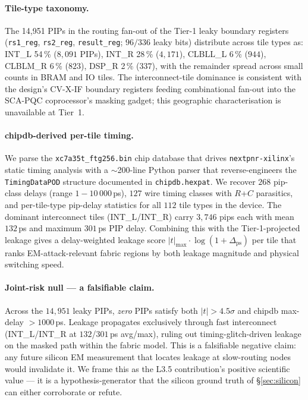 \paragraph{Tile-type taxonomy.}
The 14{,}951 PIPs in the routing fan-out of the Tier-1 leaky boundary
registers (\texttt{rs1\_reg}, \texttt{rs2\_reg}, \texttt{result\_reg};
$96/336$ leaky bits) distribute across tile types as: INT\_L 54\,\%
($8{,}091$ PIPs), INT\_R 28\,\% ($4{,}171$), CLBLL\_L 6\,\% ($944$), CLBLM\_R
6\,\% ($823$), DSP\_R 2\,\% ($337$), with the remainder spread across small
counts in BRAM and IO tiles.  The interconnect-tile dominance is consistent
with the design's CV-X-IF boundary registers feeding combinational fan-out
into the SCA-PQC coprocessor's masking gadget; this geographic
characterisation is unavailable at Tier~1.

\paragraph{chipdb-derived per-tile timing.}
We parse the \texttt{xc7a35t\_ftg256.bin} chip database that drives
\texttt{nextpnr-xilinx}'s static timing analysis with a $\sim$200-line Python
parser that reverse-engineers the \texttt{TimingDataPOD} structure documented
in \texttt{chipdb.hexpat}.  We recover $268$ pip-class delays (range
$1{-}10\,000$\,ps), $127$ wire timing classes with $R$+$C$ parasitics, and
per-tile-type pip-delay statistics for all $112$ tile types in the device.
The dominant interconnect tiles (INT\_L/INT\_R) carry $3{,}746$ pips each
with mean $132$\,ps and maximum $301$\,ps PIP delay.  Combining this with the
Tier-1-projected leakage gives a delay-weighted leakage score
$|t|_{\max} \cdot \log(1+\Delta_{\text{ps}})$ per tile that ranks
EM-attack-relevant fabric regions by both leakage magnitude and physical
switching speed.

\paragraph{Joint-risk null --- a falsifiable claim.}
Across the $14{,}951$ leaky PIPs, \emph{zero} PIPs satisfy both
$|t|>4.5\sigma$ and chipdb max-delay $>1000$\,ps.  Leakage propagates
exclusively through fast interconnect (INT\_L/INT\_R at $132$/$301$\,ps
avg/max), ruling out timing-glitch-driven leakage on the masked path within
the fabric model.  This is a falsifiable negative claim: any future silicon
EM measurement that locates leakage at slow-routing nodes would invalidate
it.  We frame this as the L3.5 contribution's positive scientific value ---
it is a hypothesis-generator that the silicon ground truth of
\S\ref{sec:silicon} can either corroborate or refute.

